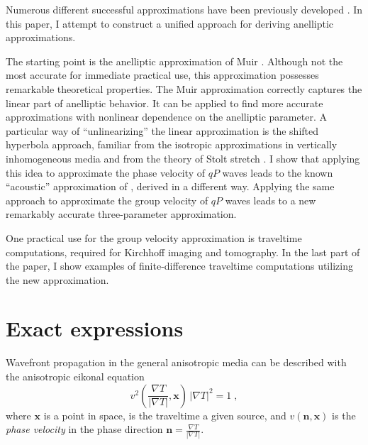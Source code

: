Numerous different successful approximations have been previously developed
\cite[]{GEO54-12-15641574,jse,GEO60-05-15501566,GEO63-02-06230631,GEO65-04-13161325,GEO65-03-09190933,ANI00-00-03490361,SEG-2001-01060109}.
In this paper, I attempt to construct a unified approach for deriving
anelliptic approximations.

The starting point is the anelliptic approximation of Muir
\cite[]{Muir.sep.44.55,jse}. Although not the most accurate for immediate
practical use, this approximation possesses remarkable theoretical properties.
The Muir approximation correctly captures the linear part of anelliptic
behavior. It can be applied to find more accurate approximations with
nonlinear dependence on the anelliptic parameter. A particular way of
``unlinearizing'' the linear approximation is the shifted hyperbola approach,
familiar from the isotropic approximations in vertically inhomogeneous media
\cite[]{malov,Sword.sep.51.313,GEO53-02-01430157,GEO59-06-09830999} and from the
theory of Stolt stretch \cite[]{GEO43-01-00230048,mystolt}. I show that applying
this idea to approximate the phase velocity of $qP$ waves leads to the known
``acoustic'' approximation of \cite{GEO63-02-06230631,GEO65-04-12391250},
derived in a different way.  Applying the same approach to approximate the
group velocity of $qP$ waves leads to a new remarkably accurate
three-parameter approximation.

One practical use for the group velocity approximation is traveltime
computations, required for Kirchhoff imaging and tomography. In the last part
of the paper, I show examples of finite-difference traveltime computations
utilizing the new approximation.

\section{Exact expressions}

Wavefront propagation in the general anisotropic media can be
described with the anisotropic eikonal equation
\begin{equation}
  \label{eq:eikonal}
  v^2\left(\frac{\nabla T}{|\nabla T|},\mathbf{x}\right)\,|\nabla T|^2 = 
  1\;,
\end{equation}
where $\mathbf{x}$ is a point in space,  is the
traveltime  a given source, and
$v(\mathbf{n},\mathbf{x})$ is the \emph{phase velocity} in the phase direction
$\mathbf{n} = \frac{\nabla T}{|\nabla T|}$.

